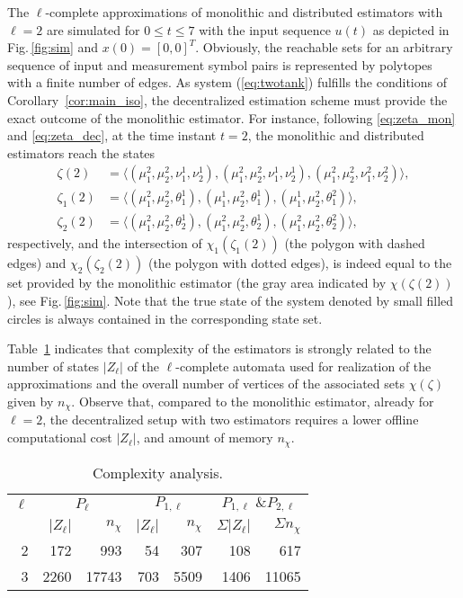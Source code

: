 \documentclass[a4paper, 10pt, conference]{ieeeconf}
\begin{document}
The $\ell$-complete approximations of monolithic and distributed estimators with $\ell=2$ are simulated for $0\leq t\leq 7$ with the input sequence $u(t)$ as depicted in Fig.\,\ref{fig:sim} and $x(0)=[0, 0]^T$. Obviously, the reachable sets for an arbitrary sequence of input and measurement symbol pairs is represented by polytopes with a finite number of edges. As  system (\ref{eq:twotank}) fulfills the conditions of Corollary~\ref{cor:main_iso}, the decentralized estimation scheme must provide the exact outcome of the monolithic estimator. For instance, following \eqref{eq:zeta_mon} and \eqref{eq:zeta_dec}, at the time instant  $t=2$, the monolithic and distributed estimators reach the states
\begin{align*}
\zeta(2)&=\langle(\mu_{1}^2,\mu_{2}^2,\nu_{1}^1,\nu_{2}^1),(\mu_{1}^2,\mu_{2}^2,\nu_{1}^1,\nu_{2}^1),(\mu_{1}^2,\mu_{2}^2,\nu_{1}^2,\nu_{2}^2)\rangle, \\
\zeta_1(2)&=\langle(\mu_{1}^2,\mu_{2}^2,\theta_{1}^1),(\mu_{1}^1,\mu_{2}^2,\theta_{1}^1),(\mu_{1}^1,\mu_{2}^2,\theta_{1}^2)\rangle, \\
\zeta_2(2)&=\langle(\mu_{1}^2,\mu_{2}^2,\theta_{2}^1),(\mu_{1}^2,\mu_{2}^2,\theta_{2}^1),(\mu_{1}^2,\mu_{2}^2,\theta_{2}^2)\rangle,
\end{align*}
respectively, and the intersection of $\chi_1(\zeta_1(2))$ (the polygon with dashed edges) and $\chi_2(\zeta_2(2))$ (the polygon with dotted edges), is indeed equal to the set provided by the monolithic estimator (the gray area indicated by $\chi(\zeta(2))$), see Fig.\,\ref{fig:sim}.
Note that the true state of the system denoted by small filled circles is always contained in the corresponding state set.

Table~\ref{tab:twotankl} indicates that complexity of the estimators is strongly related to the number of states $|Z_\ell|$ of the $\ell$-complete automata used for realization of the approximations and the overall number of vertices of the associated sets $\chi(\zeta)$ given by $n_{\chi}$. Observe that, compared to the monolithic estimator, already for $\ell=2$, the decentralized setup with two estimators requires a lower offline computational cost $|Z_\ell|$, and amount of memory $n_\chi$.



\vspace{-5pt}
\begin{table}[!h]
	\centering
		\begin{tabular}{r|r@{  }r|r@{  }r|r@{  }r}
		\toprule
			$\ell$ & \multicolumn{2}{|c|}{$P_{\ell}$} & \multicolumn{2}{|c|}{$P_{1,\ell}$} & \multicolumn{2}{c}{$P_{1,\ell} \text{ \& } P_{2,\ell}$} \\
			& $|Z_\ell|$ & $n_{\chi}$ & $|Z_\ell|$ & $ n_{\chi}$  & $\Sigma |Z_\ell|$ & $ \Sigma n_{\chi}$ \\
			\midrule
			2& 172 & 993 & 54 & 307 & 108 & 617\\
			3& 2260 &17743 &703 &5509 &1406 & 11065\\
			\bottomrule
		\end{tabular}
\caption{Complexity analysis.}
	\label{tab:twotankl}
\end{table}
\end{document}
